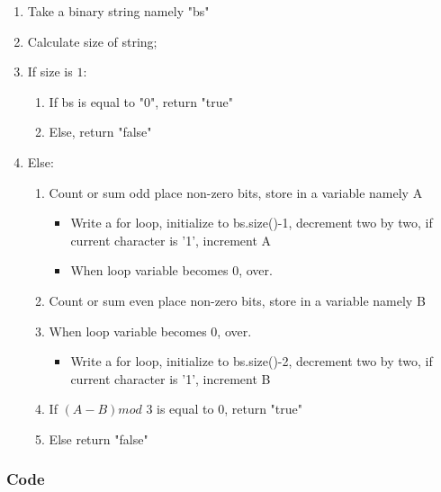 \documentclass[11 pt]{article}
\begin{document}
\begin{tcolorbox}

\begin{enumerate}

\item Take a binary string namely "bs"
\item Calculate size of string;
\item If size is $1$:
 \begin{enumerate}
  \item If bs is equal to "0", return "true"
  \item Else, return "false"
 \end{enumerate}
\item Else:
\begin{enumerate}

\item Count or sum odd place non-zero bits, store in a variable namely A
 \begin{itemize}
 \item Write a for loop, initialize to bs.size()-1, decrement two by two, if current character is '1', increment A
 \item When loop variable becomes 0, over.
 \end{itemize}
\item Count or sum even place non-zero bits, store in a variable namely B
\item When loop variable becomes 0, over.
 \begin{itemize}
 \item Write a for loop, initialize to bs.size()-2, decrement two by two, if current character is '1', increment B
 \end{itemize}
\item If $(A-B) mod$ $3$ is equal to $0$, return "true"
\item Else return "false"

\end{enumerate}
\end{enumerate}
\end{tcolorbox}

\subsubsection{Code}
\end{document}
